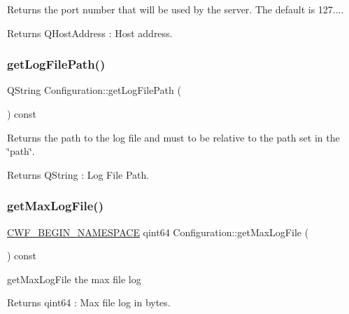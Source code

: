 Returns the port number that will be used by the server. The default is 127.... 

\begin{DoxyReturn}{Returns}
Q\+Host\+Address \+: Host address. 
\end{DoxyReturn}
\mbox{\label{class_configuration_a005e1d10c605e08d73ff274f2b19fc48}} 
\subsubsection{\texorpdfstring{get\+Log\+File\+Path()}{getLogFilePath()}}
{\footnotesize\ttfamily Q\+String Configuration\+::get\+Log\+File\+Path (\begin{DoxyParamCaption}{ }\end{DoxyParamCaption}) const}



Returns the path to the log file and must to be relative to the path set in the \char`\"{}path\char`\"{}. 

\begin{DoxyReturn}{Returns}
Q\+String \+: Log File Path. 
\end{DoxyReturn}
\mbox{\label{class_configuration_a05ee88466fbe346175ec6420b6857b98}} 
\subsubsection{\texorpdfstring{get\+Max\+Log\+File()}{getMaxLogFile()}}
{\footnotesize\ttfamily \hyperlink{cppwebframework__global_8h_a7492e9498cbaf9cd17dbc2215d3a0e48}{C\+W\+F\+\_\+\+B\+E\+G\+I\+N\+\_\+\+N\+A\+M\+E\+S\+P\+A\+CE} qint64 Configuration\+::get\+Max\+Log\+File (\begin{DoxyParamCaption}{ }\end{DoxyParamCaption}) const}



get\+Max\+Log\+File the max file log 

\begin{DoxyReturn}{Returns}
qint64 \+: Max file log in bytes. 
\end{DoxyReturn}
\mbox{\label{class_configuration_ad0e836129d0a7e0111b1f2c092729939}} 
